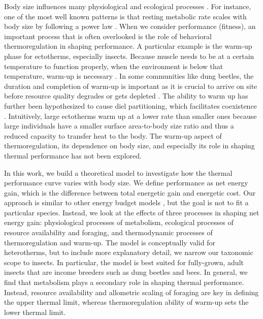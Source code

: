 Body size influences many physiological and ecological processes \citep{Peters1986}.
For instance, one of the most well known patterns is that resting metabolic rate scales with body size by following a power law \citep{Kleiber1947, Peters1986, Gillooly2001,Brown2004}.
When we consider performance (fitness), an important process that is often overlooked is the role of behavioral thermoregulation in shaping performance. 
A particular example is the warm-up phase for ectotherms, especially insects.
Because muscle needs to be at a certain temperature to function properly, when the environment is below that temperature, warm-up is necessary \citep[e.g.,][]{Heinrich1975}. 
In some communities like dung beetles, the duration and completion of warm-up is important as it is crucial to arrive on site before resource quality degrades or gets depleted \citep{Hanski1991}. %
The ability to warm up has further been hypothesized to cause diel partitioning, which facilitates coexistence \citep{Viljanen2009}.
Intuitively, large ectotherms warm up at a lower rate than smaller ones because large individuals have a smaller surface area-to-body size ratio and thus a reduced capacity to transfer heat to the body.
The warm-up aspect of thermoregulation, its dependence on body size, and especially its role in shaping thermal performance has not been explored.
 
In this work, we build a theoretical model to investigate how the thermal performance curve varies with body size.
We define performance as net energy gain, which is the difference between total energetic gain and energetic cost. 
Our approach is similar to other energy budget models \citep[e.g.,][]{Kooijman2009}, but the goal is not to fit a particular species.
Instead, we look at the effects of three processes in shaping net energy gain: physiological processes of metabolism, ecological processes of resource availability and foraging, and thermodynamic processes of thermoregulation and warm-up.  %
The model is conceptually valid for heterotherms, but to include more explanatory detail, we narrow our taxonomic scope to insects.
In particular, the model is best suited for fully-grown, adult insects that are income breeders such as dung beetles and bees.
In general, we find that metabolism plays a secondary role in shaping thermal performance.
Instead, resource availability and allometric scaling of foraging are key in defining the upper thermal limit, whereas thermoregulation ability of warm-up sets the lower thermal limit.
